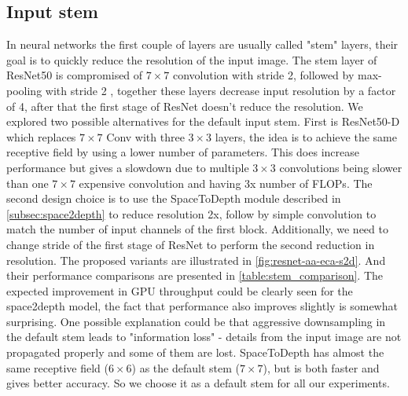 
\subsection{Input stem} \label{subsec:stem_ablation}

In neural networks the first couple of layers are usually called "stem" layers, their goal is to quickly reduce the resolution of the input image. The stem layer of ResNet50 is compromised of $7 \times 7$ convolution with stride 2, followed by max-pooling with stride 2 \cite{he2016deep_resnetv1}, together these layers decrease input resolution by a factor of 4, after that the first stage of ResNet doesn't reduce the resolution. We explored two possible alternatives for the default input stem. First is ResNet50-D which replaces $7 \times 7$ Conv with three $3 \times 3$ layers, the idea is to achieve the same receptive field by using a lower number of parameters. This does increase performance but gives a slowdown due to multiple $3 \times 3$ convolutions being slower than one $7 \times 7$ expensive convolution and having 3x number of FLOPs. The second design choice is to use the SpaceToDepth module described in \autoref{subsec:space2depth} to reduce resolution 2x, follow by simple convolution to match the number of input channels of the first block. Additionally, we need to change stride of the first stage of ResNet to perform the second reduction in resolution. The proposed variants are illustrated in \autoref{fig:resnet-aa-eca-s2d}.
And their performance comparisons are presented in \autoref{table:stem_comparison}. The expected improvement in GPU throughput could be clearly seen for the space2depth model, the fact that performance also improves slightly is somewhat surprising. One possible explanation could be that aggressive downsampling in the default stem leads to "information loss" - details from the input image are not propagated properly and some of them are lost. SpaceToDepth has almost the same receptive field ($6 \times 6$) as the default stem ($ 7 \times 7$), but is both faster and gives better accuracy. So we choose it as a default stem for all our experiments.

